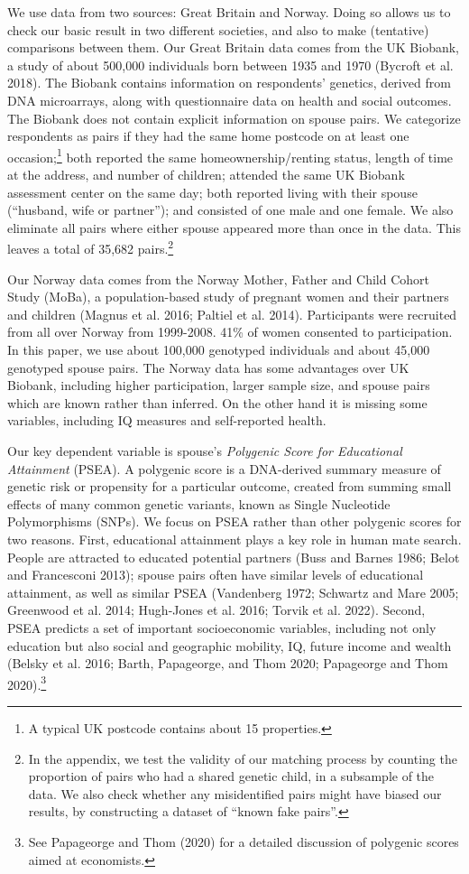 \documentclass[
  12pt,
]{article}
\theoremstyle{definition}
\theoremstyle{definition}
\theoremstyle{definition}
\theoremstyle{definition}
\theoremstyle{remark}
\begin{document}
We use data from two sources: Great Britain and Norway. Doing so allows us to
check our basic result in two different societies, and also to make
(tentative) comparisons between them. Our Great Britain data
comes from the UK Biobank, a study of about 500,000 individuals born between
1935 and 1970 (Bycroft et al. 2018). The Biobank contains information on respondents'
genetics, derived from DNA microarrays, along with questionnaire data on health
and social outcomes. The Biobank does not contain explicit information on spouse
pairs. We categorize respondents as pairs if they had the same home postcode on at least
one occasion;\footnote{A typical UK postcode contains about 15 properties.} both reported the same homeownership/renting status, length of time
at the address, and number of children; attended the same UK Biobank assessment
center on the same day; both reported living with their spouse (``husband, wife or
partner''); and consisted of one male and one female.
We also eliminate all pairs where either spouse appeared more than once
in the data. This leaves a total of 35,682 pairs.\footnote{In the appendix, we test the validity of our matching process by
  counting the proportion of pairs who had a shared genetic child, in a subsample
  of the data. We also check whether any misidentified pairs might have biased our
  results, by constructing a dataset of ``known fake pairs''.}

Our Norway data comes from the Norway Mother, Father and Child Cohort Study
(MoBa), a population-based study of pregnant women and their partners and children
(Magnus et al. 2016; Paltiel et al. 2014). Participants were recruited from all
over Norway from 1999-2008. 41\% of women consented to participation. In this
paper, we use about 100,000 genotyped individuals and about 45,000 genotyped
spouse pairs. The Norway data has some advantages over UK Biobank, including higher
participation, larger sample size, and spouse pairs which are known rather than
inferred. On the other hand it is missing some variables, including IQ measures
and self-reported health.

Our key dependent variable is spouse's \emph{Polygenic Score for Educational
Attainment} (PSEA). A polygenic score is a DNA-derived summary measure
of genetic risk or propensity for a particular outcome, created from
summing small effects of many common genetic variants, known as Single
Nucleotide Polymorphisms (SNPs). We focus on PSEA rather than other
polygenic scores for two reasons. First, educational attainment plays a key role in
human mate search. People are attracted to educated potential partners
(Buss and Barnes 1986; Belot and Francesconi 2013); spouse pairs often have
similar levels of educational attainment, as well as similar PSEA
(Vandenberg 1972; Schwartz and Mare 2005; Greenwood et al. 2014; Hugh-Jones et al. 2016; Torvik et al. 2022). Second, PSEA predicts a set of
important socioeconomic variables, including not only education but also social
and geographic mobility, IQ, future income and wealth (Belsky et al. 2016; Barth, Papageorge, and Thom 2020; Papageorge and Thom 2020).\footnote{See Papageorge and Thom (2020) for a detailed discussion of polygenic
  scores aimed at economists.}
\end{document}
